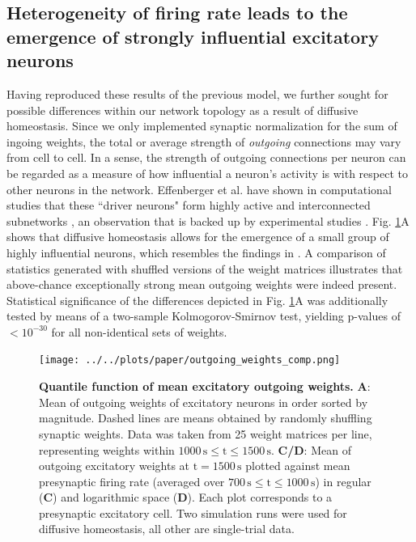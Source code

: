 \documentclass[10pt,letterpaper]{article}
\begin{document}
\subsection*{Heterogeneity of firing rate leads to the emergence of strongly influential excitatory neurons}\label{Section_Mean_outgoing_Weights}
Having reproduced these results of the previous model, we further sought for possible differences within our network topology as a result of diffusive homeostasis. Since we only implemented synaptic normalization for the sum of ingoing weights, the total or average strength of \emph{outgoing} connections may vary from cell to cell. In a sense, the strength of outgoing connections per neuron can be regarded as a measure of how influential a neuron's activity is with respect to other neurons in the network. Effenberger et al. have shown in computational studies that these ``driver neurons" form highly active and interconnected subnetworks \cite{Effenberger_2015}, an observation that is backed up by experimental studies \cite{Yassin_Subnetworks_2010,Eckmann_Leader_Neurons_2008}. Fig. \ref{Outgoing_Weights_Comp}A shows that diffusive homeostasis allows for the emergence of a small group of highly influential neurons, which resembles the findings in \cite{Effenberger_2015}. A comparison of statistics generated with shuffled versions of the weight matrices illustrates that above-chance exceptionally strong mean outgoing weights were indeed present. Statistical significance of the differences depicted in Fig. \ref{Outgoing_Weights_Comp}A was additionally tested by means of a two-sample Kolmogorov-Smirnov test, yielding p-values of $< 10^{-30}$ for all non-identical sets of weights.

\begin{figure}
\texttt{[image: ../../plots/paper/outgoing\_weights\_comp.png]}
\caption{{\bf Quantile function of mean excitatory outgoing weights.} \textbf{A}: Mean of outgoing weights of excitatory neurons in order sorted by magnitude. Dashed lines are means obtained by randomly shuffling synaptic weights. Data was taken from 25 weight matrices per line, representing weights within $\mathrm{1000\,s \leq t \leq 1500\,s}$. \textbf{C/D}: Mean of outgoing excitatory weights at $\mathrm{t=1500\,s}$ plotted against mean presynaptic firing rate (averaged over $\mathrm{700\,s \leq t \leq 1000\,s}$) in regular (\textbf{C}) and logarithmic space (\textbf{D}). Each plot corresponds to a presynaptic excitatory cell. Two simulation runs were used for diffusive homeostasis, all other are single-trial data.}
\label{Outgoing_Weights_Comp}
\end{figure}
\end{document}
